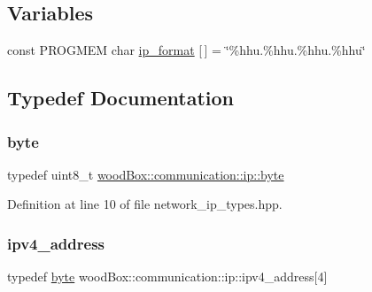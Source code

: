 \subsection*{Variables}
\begin{DoxyCompactItemize}
\item 
const P\+R\+O\+G\+M\+EM char \mbox{\hyperlink{namespacewood_box_1_1communication_1_1ip_a6b47ca4e737d6bca23c7ec31d3ab3402}{ip\+\_\+format}} \mbox{[}$\,$\mbox{]} = \char`\"{}\%hhu.\%hhu.\%hhu.\%hhu\char`\"{}
\end{DoxyCompactItemize}


\subsection{Typedef Documentation}
\mbox{\label{namespacewood_box_1_1communication_1_1ip_af1b00b9755ebc1bbeb6b5be2068bb421}} 
\subsubsection{\texorpdfstring{byte}{byte}}
{\footnotesize\ttfamily typedef uint8\+\_\+t \mbox{\hyperlink{namespacewood_box_1_1communication_1_1ip_af1b00b9755ebc1bbeb6b5be2068bb421}{wood\+Box\+::communication\+::ip\+::byte}}}



Definition at line 10 of file network\+\_\+ip\+\_\+types.\+hpp.

\mbox{\label{namespacewood_box_1_1communication_1_1ip_afb5b3a2d174b71ebd2753541752aee47}} 
\subsubsection{\texorpdfstring{ipv4\+\_\+address}{ipv4\_address}}
{\footnotesize\ttfamily typedef \mbox{\hyperlink{namespacewood_box_1_1communication_1_1ip_af1b00b9755ebc1bbeb6b5be2068bb421}{byte}} wood\+Box\+::communication\+::ip\+::ipv4\+\_\+address\mbox{[}4\mbox{]}}




